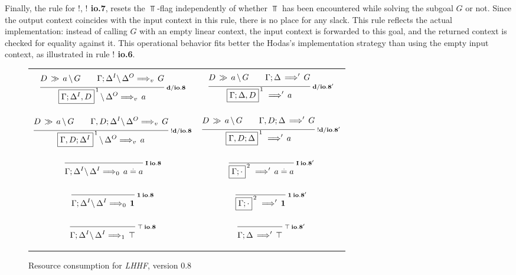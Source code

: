 Finally, the rule for $!$, {\bf $!$ io.7}, resets the $\Top$-flag
independently of whether $\Top$ has been encountered while solving the
subgoal $G$ or not. Since the output context coincides with the input context
in this rule, there is no place for any slack. This rule reflects the actual
implementation: instead of calling $G$ with an empty linear context, the
input context is forwarded to this goal, and the returned context is checked
for equality against it. This operational behavior fits better the Hodas's
implementation strategy than using the empty input context, as illustrated in
rule {\bf $!$ io.6}.


\clearpage
\begin{figure}[t]
  \begin{center}
    \leavevmode

    \begin{tabular}{|c|c|}
      \hline &\\
      $\ruleII
        {\decd{D}{a}{G}}
        {\ioVIII{\G;\D^I}{\D^O}{G}{v}}
        {\ioVIII{\fb{\G;\D^I,D}{1}}{\D^O}{a}{v}}
        {d/io.8}$
      &
      $\ruleII
        {\decd{D}{a}{G}}
        {\ioVIIIa{\G;\D}{G}}
        {\ioVIIIa{\fb{\G;\D,D}{1}}{a}}
        {d/io.8'}$
      \\&\\&\\

      $\ruleII
        {\decd{D}{a}{G}}
        {\ioVIII{\G,D;\D^I}{\D^O}{G}{v}}
        {\ioVIII{\fb{\G,D;\D^I}{1}}{\D^O}{a}{v}}
        {!d/io.8}$
      &
      $\ruleII
        {\decd{D}{a}{G}}
        {\ioVIIIa{\G,D;\D}{G}}
        {\ioVIIIa{\fb{\G,D;\D}{1}}{a}}
        {!d/io.8'}$
      \\&\\

      $\ruleI
        {}
        {\ioVIII{\G;\D^I}{\D^I}{\eq{a}{a}}{0}}
        {I \: io.8}$
      &
      $\ruleI
        {}
        {\ioVIIIa{\fb{\G;\cdot}{2}}{\eq{a}{a}}}
        {I \: io.8'}$
      \\&\\

      $\ruleI
        {}
        {\ioVIII{\G;\D^I}{\D^I}{\One}{0}}
        {\One \: io.8}$
      &
      $\ruleI
        {}
        {\ioVIIIa{\fb{\G;\cdot}{2}}{\One}}
        {\One \: io.8'}$
      \\&\\

      $\ruleI
        {}
        {\ioVIII{\G;\D^I}{\D^I}{\Top}{1}}
        {\Top \: io.8}$
      &
      $\ruleI
        {}
        {\ioVIIIa{\G;\D}{\Top}}
        {\Top \: io.8'}$
      \\&\\
      \hline
    \end{tabular}

    \caption{Resource consumption for {\em LHHF}, version 0.8}
    \label{fig:RC_VIII1}
  \end{center}
\end{figure}


